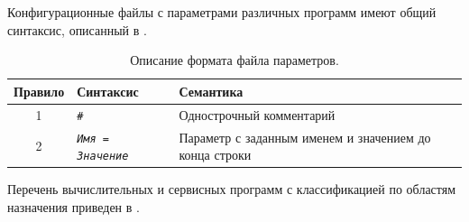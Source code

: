 Конфигурационные файлы с параметрами различных программ имеют общий
синтаксис, описанный в .

\begin{table}[ht]
\centering
\caption{Описание формата файла параметров.}
\label{tabl:par_syntax}
\begin{tabular}{|c|l|p{10cm}|}
\hline
Правило & Синтаксис & Семантика \\
\hline
1 & \tt \#                 & Однострочный комментарий \\
2 & \tt \em Имя = Значение & Параметр с заданным именем и значением до конца строки \\
\hline
\end{tabular}
\end{table}

Перечень вычислительных и сервисных программ с классификацией по
областям назначения приведен в .

